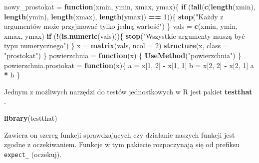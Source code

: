 \documentclass[paper=6in:9in,pagesize=pdftex,headinclude=on,footinclude=on,10pt]{scrbook}
\newenvironment{Shaded}{\begin{snugshade}}{\end{snugshade}}
\newcommand{\ControlFlowTok}[1]{\textcolor[rgb]{0.13,0.29,0.53}{\textbf{#1}}}
\newcommand{\DataTypeTok}[1]{\textcolor[rgb]{0.13,0.29,0.53}{#1}}
\newcommand{\DecValTok}[1]{\textcolor[rgb]{0.00,0.00,0.81}{#1}}
\newcommand{\KeywordTok}[1]{\textcolor[rgb]{0.13,0.29,0.53}{\textbf{#1}}}
\newcommand{\NormalTok}[1]{#1}
\newcommand{\OperatorTok}[1]{\textcolor[rgb]{0.81,0.36,0.00}{\textbf{#1}}}
\newcommand{\StringTok}[1]{\textcolor[rgb]{0.31,0.60,0.02}{#1}}
\begin{document}
\begin{Shaded}
\begin{Highlighting}[]
\NormalTok{nowy_prostokat =}\StringTok{ }\ControlFlowTok{function}\NormalTok{(xmin, ymin, xmax, ymax)\{}
  \ControlFlowTok{if}\NormalTok{ (}\OperatorTok{!}\KeywordTok{all}\NormalTok{(}\KeywordTok{c}\NormalTok{(}\KeywordTok{length}\NormalTok{(xmin), }\KeywordTok{length}\NormalTok{(ymin), }\KeywordTok{length}\NormalTok{(xmax), }\KeywordTok{length}\NormalTok{(ymax)) }\OperatorTok{==}\StringTok{ }\DecValTok{1}\NormalTok{))\{}
    \KeywordTok{stop}\NormalTok{(}\StringTok{"Każdy z argumentów może przyjmować tylko jedną wartość"}\NormalTok{)}
\NormalTok{  \}}
\NormalTok{  vals =}\StringTok{ }\KeywordTok{c}\NormalTok{(xmin, ymin, xmax, ymax)}
  \ControlFlowTok{if}\NormalTok{ (}\OperatorTok{!}\NormalTok{(}\KeywordTok{is.numeric}\NormalTok{(vals)))\{}
    \KeywordTok{stop}\NormalTok{(}\StringTok{"Wszystkie argumenty muszą być typu numerycznego"}\NormalTok{)}
\NormalTok{  \}}
\NormalTok{  x =}\StringTok{ }\KeywordTok{matrix}\NormalTok{(vals, }\DataTypeTok{ncol =} \DecValTok{2}\NormalTok{)}
  \KeywordTok{structure}\NormalTok{(x, }\DataTypeTok{class =} \StringTok{"prostokat"}\NormalTok{)}
\NormalTok{\}}
\NormalTok{powierzchnia =}\StringTok{ }\ControlFlowTok{function}\NormalTok{(x) \{}
  \KeywordTok{UseMethod}\NormalTok{(}\StringTok{"powierzchnia"}\NormalTok{)}
\NormalTok{\}}
\NormalTok{powierzchnia.prostokat =}\StringTok{ }\ControlFlowTok{function}\NormalTok{(x)\{}
\NormalTok{  a =}\StringTok{ }\NormalTok{x[}\DecValTok{1}\NormalTok{, }\DecValTok{2}\NormalTok{] }\OperatorTok{-}\StringTok{ }\NormalTok{x[}\DecValTok{1}\NormalTok{, }\DecValTok{1}\NormalTok{]}
\NormalTok{  b =}\StringTok{ }\NormalTok{x[}\DecValTok{2}\NormalTok{, }\DecValTok{2}\NormalTok{] }\OperatorTok{-}\StringTok{ }\NormalTok{x[}\DecValTok{2}\NormalTok{, }\DecValTok{1}\NormalTok{]}
\NormalTok{  a }\OperatorTok{*}\StringTok{ }\NormalTok{b}
\NormalTok{\}}
\end{Highlighting}
\end{Shaded}

Jednym z możliwych narzędzi do testów jednostkowych w R jest pakiet \textbf{testthat} \citep{R-testthat}.

\begin{Shaded}
\begin{Highlighting}[]
\KeywordTok{library}\NormalTok{(testthat)}
\end{Highlighting}
\end{Shaded}

Zawiera on szereg funkcji sprawdzających czy działanie naszych funkcji jest zgodne z oczekiwaniem.
Funkcje w tym pakiecie rozpoczynają się od prefiksu \texttt{expect\_} (oczekuj).
\end{document}
